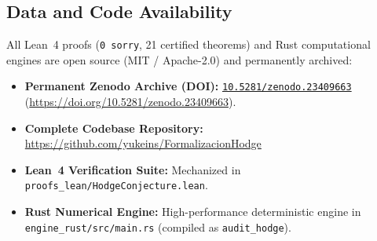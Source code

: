 \documentclass[11pt,a4paper]{article}
\theoremstyle{definition}
\theoremstyle{plain}
\begin{document}
\subsection*{Data and Code Availability}
All Lean~4 proofs (\texttt{0 sorry}, 21 certified theorems) and Rust computational engines are open source (MIT / Apache-2.0) and permanently archived:
\begin{itemize}[leftmargin=1.5em, itemsep=2pt]
    \item \textbf{Permanent Zenodo Archive (DOI):} \href{https://doi.org/10.5281/zenodo.23409663}{\texttt{10.5281/zenodo.23409663}} (\url{https://doi.org/10.5281/zenodo.23409663}).
    \item \textbf{Complete Codebase Repository:} \url{https://github.com/yukeins/FormalizacionHodge}
    \item \textbf{Lean~4 Verification Suite:} Mechanized in \texttt{proofs\_lean/HodgeConjecture.lean}.
    \item \textbf{Rust Numerical Engine:} High-performance deterministic engine in \texttt{engine\_rust/src/main.rs} (compiled as \texttt{audit\_hodge}).
\end{itemize}
\end{document}
